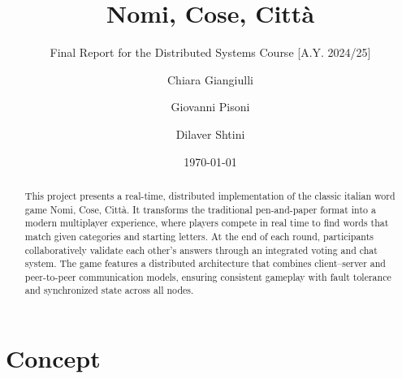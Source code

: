 \documentclass{scrartcl}
\title{\LARGE
    Nomi, Cose, Città
}
\subtitle{Final Report for the Distributed Systems Course [A.Y. 2024/25]}
\author{
    Chiara Giangiulli \\ \emailaddr{chiara.giangiulli@studio.unibo.it}
    \and
    Giovanni Pisoni\\ \emailaddr{giovanni.pisoni@studio.unibo.it}
    \and
    Dilaver Shtini\\ \emailaddr{dilaver.shtini@studio.unibo.it}
}
\date{\today}
\begin{document}
\maketitle

\begin{abstract}
This project presents a real-time, distributed implementation of the classic italian word game Nomi, Cose, Città.
It transforms the traditional pen-and-paper format into a modern multiplayer experience, 
where players compete in real time to find words that match given categories and starting letters.
At the end of each round, participants collaboratively validate each other’s answers through an integrated voting and chat system.
The game features a distributed architecture that combines client–server and peer-to-peer communication models, 
ensuring consistent gameplay with fault tolerance and synchronized state across all nodes.
\end{abstract}

\newpage

\section{Concept}\label{concept}
\end{document}
